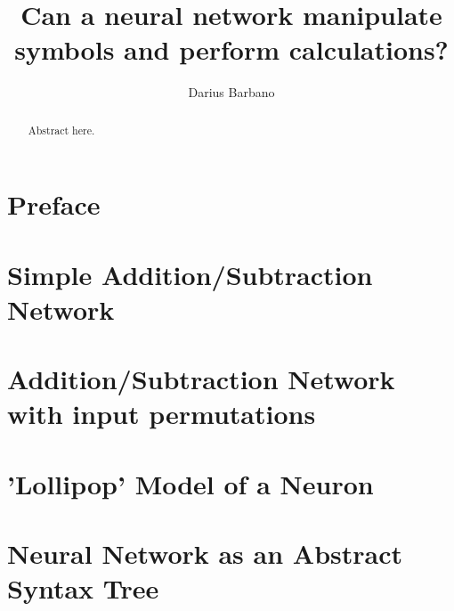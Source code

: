 \documentclass[12pt]{article}
\begin{document}
\title{Can a neural network manipulate symbols and perform calculations? }
\author{Darius Barbano}
\date{}
\maketitle
\begin{abstract}
   Abstract here.
\end{abstract}
\newpage
\section{Preface}


\newpage
\section{Simple Addition/Subtraction Network}


\newpage
\section{Addition/Subtraction Network with input permutations}


\newpage
\section{'Lollipop' Model of a Neuron}


\newpage
\section{Neural Network as an Abstract Syntax Tree}

\end{document}
